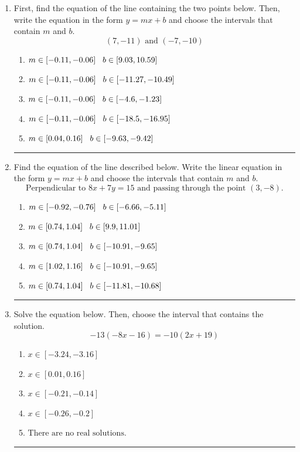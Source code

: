 \documentclass[14pt]{extbook}
\newcommand{\litem}[1]{\item#1\hspace*{-1cm}\rule{\textwidth}{0.4pt}}
\begin{document}
\begin{enumerate}
{\begin{enumerate}[label=\Alph*.]
\end{enumerate} }
\litem{
First, find the equation of the line containing the two points below. Then, write the equation in the form $ y=mx+b $ and choose the intervals that contain $m$ and $b$.\[ (7, -11) \text{ and } (-7, -10) \]\begin{enumerate}[label=\Alph*.]
\item \( m \in [-0.11, -0.06] \hspace*{3mm} b \in [9.03, 10.59] \)
\item \( m \in [-0.11, -0.06] \hspace*{3mm} b \in [-11.27, -10.49] \)
\item \( m \in [-0.11, -0.06] \hspace*{3mm} b \in [-4.6, -1.23] \)
\item \( m \in [-0.11, -0.06] \hspace*{3mm} b \in [-18.5, -16.95] \)
\item \( m \in [0.04, 0.16] \hspace*{3mm} b \in [-9.63, -9.42] \)

\end{enumerate} }
\litem{
Find the equation of the line described below. Write the linear equation in the form $ y=mx+b $ and choose the intervals that contain $m$ and $b$.\[ \text{Perpendicular to } 8 x + 7 y = 15 \text{ and passing through the point } (3, -8). \]\begin{enumerate}[label=\Alph*.]
\item \( m \in [-0.92, -0.76] \hspace*{3mm} b \in [-6.66, -5.11] \)
\item \( m \in [0.74, 1.04] \hspace*{3mm} b \in [9.9, 11.01] \)
\item \( m \in [0.74, 1.04] \hspace*{3mm} b \in [-10.91, -9.65] \)
\item \( m \in [1.02, 1.16] \hspace*{3mm} b \in [-10.91, -9.65] \)
\item \( m \in [0.74, 1.04] \hspace*{3mm} b \in [-11.81, -10.68] \)

\end{enumerate} }
\litem{
Solve the equation below. Then, choose the interval that contains the solution.\[ -13(-8x -16) = -10(2x + 19) \]\begin{enumerate}[label=\Alph*.]
\item \( x \in [-3.24, -3.16] \)
\item \( x \in [0.01, 0.16] \)
\item \( x \in [-0.21, -0.14] \)
\item \( x \in [-0.26, -0.2] \)
\item \( \text{There are no real solutions.} \)


\end{enumerate}}
\end{enumerate}
\end{document}
